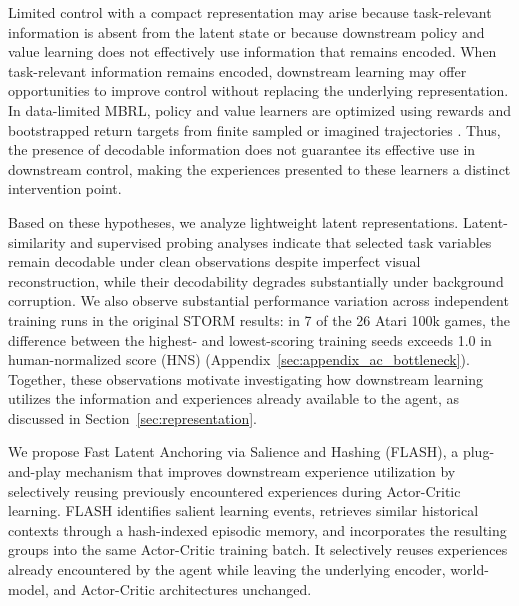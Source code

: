 \documentclass{article} %
\begin{document}
Limited control with a compact representation may arise because task-relevant information is absent from the latent state or because downstream policy and value learning does not effectively use information that remains encoded. When task-relevant information remains encoded, downstream learning may offer opportunities to improve control without replacing the underlying representation. In data-limited MBRL, policy and value learners are optimized using rewards and bootstrapped return targets from finite sampled or imagined trajectories \citep{hafner2020mastering, wang2025drama}. Thus, the presence of decodable information does not guarantee its effective use in downstream control, making the experiences presented to these learners a distinct intervention point.

Based on these hypotheses, we analyze lightweight latent representations. Latent-similarity and supervised probing analyses indicate that selected task variables remain decodable under clean observations despite imperfect visual reconstruction, while their decodability degrades substantially under background corruption. We also observe substantial performance variation across independent training runs in the original STORM results: in 7 of the 26 Atari 100k games, the difference between the highest- and lowest-scoring training seeds exceeds 1.0 in human-normalized score (HNS) (Appendix~\ref{sec:appendix_ac_bottleneck}). Together, these observations motivate investigating how downstream learning utilizes the information and experiences already available to the agent, as discussed in Section~\ref{sec:representation}.

We propose Fast Latent Anchoring via Salience and Hashing (FLASH), a plug-and-play mechanism that improves downstream experience utilization by selectively reusing previously encountered experiences during Actor-Critic learning. FLASH identifies salient learning events, retrieves similar historical contexts through a hash-indexed episodic memory, and incorporates the resulting groups into the same Actor-Critic training batch. It selectively reuses experiences already encountered by the agent while leaving the underlying encoder, world-model, and Actor-Critic architectures unchanged.
\end{document}
